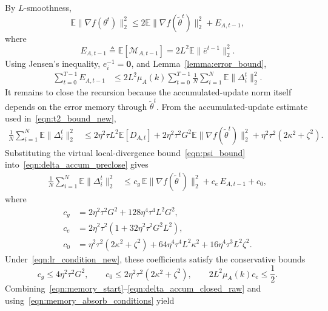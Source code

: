 \documentclass[journal]{IEEEtran}
\begin{document}
By $L$-smoothness,
\begin{equation}
    \mathbb{E}\|\nabla f(\theta^t)\|_2^2
    \le
    2\mathbb{E}\|\nabla f(\tilde\theta^t)\|_2^2+E_{A,t-1},
\end{equation}
where
\begin{equation}
    E_{A,t-1}
    \triangleq
    \mathbb{E}[\mathcal{M}_{A,t-1}]
    =2L^2\mathbb{E}\|\bar e^{t-1}\|_2^2.
\end{equation}
Using Jensen's inequality, $e_i^{-1}=\mathbf{0}$, and Lemma~\ref{lemma:error_bound},
\begin{align}
    \sum_{t=0}^{T-1}E_{A,t-1}
    &\le
    2L^2\mu_A(k)
    \sum_{t=0}^{T-1}\frac1N\sum_{i=1}^{N}\mathbb{E}\|\Delta_i^t\|_2^2.
    \label{eqn:memory_start}
\end{align}
It remains to close the recursion because the accumulated-update norm itself depends on the error memory through $\tilde\theta^t$.
From the accumulated-update estimate used in~\eqref{eqn:t2_bound_new},
\begin{align}
    \frac1N\sum_{i=1}^{N}\mathbb{E}\|\Delta_i^t\|_2^2
    &\le
    2\eta^2\tau L^2\mathbb{E}[D_{A,t}]
    +2\eta^2\tau^2G^2\mathbb{E}\|\nabla f(\tilde\theta^t)\|_2^2
    +\eta^2\tau^2(2\kappa^2+\zeta^2).
    \label{eqn:delta_accum_preclose}
\end{align}
Substituting the virtual local-divergence bound~\eqref{eqn:psi_bound} into~\eqref{eqn:delta_accum_preclose} gives
\begin{align}
    \frac1N\sum_{i=1}^{N}\mathbb{E}\|\Delta_i^t\|_2^2
    &\le
    c_{g}\,\mathbb{E}\|\nabla f(\tilde\theta^t)\|_2^2
    +c_{e}\,E_{A,t-1}
    +c_{0},
    \label{eqn:delta_accum_closed_raw}
\end{align}
where
\begin{align}
    c_g&=2\eta^2\tau^2G^2+128\eta^4\tau^4L^2G^2,\\
    c_e&=2\eta^2\tau^2\left(1+32\eta^2\tau^2G^2L^2\right),\\
    c_0&=\eta^2\tau^2(2\kappa^2+\zeta^2)
    +64\eta^4\tau^4L^2\kappa^2
    +16\eta^4\tau^3L^2\zeta^2.
\end{align}
Under~\eqref{eqn:lr_condition_new}, these coefficients satisfy the conservative bounds
\begin{equation}
    c_g\le 4\eta^2\tau^2G^2,
    \qquad
    c_0\le 2\eta^2\tau^2(2\kappa^2+\zeta^2),
    \qquad
    2L^2\mu_A(k)c_e\le \frac12.
    \label{eqn:memory_absorb_conditions}
\end{equation}
Combining~\eqref{eqn:memory_start}--\eqref{eqn:delta_accum_closed_raw} and using~\eqref{eqn:memory_absorb_conditions} yield
\end{document}
